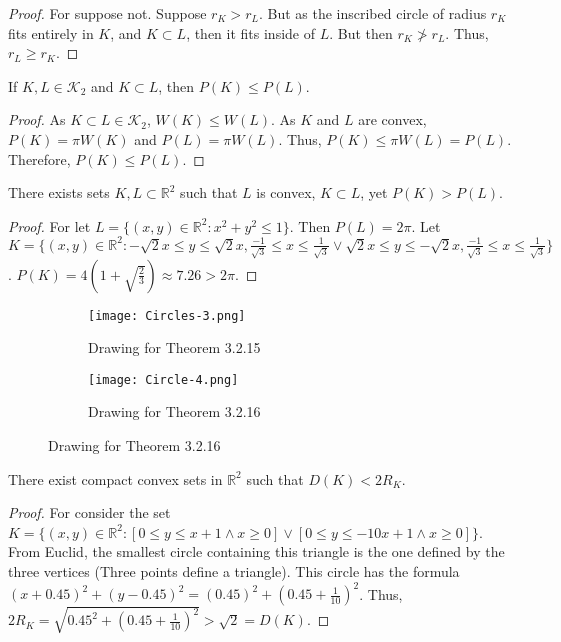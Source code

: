 \documentclass[crop=false,class=article,oneside]{standalone}
\begin{document}
        \begin{proof}
        For suppose not. Suppose $r_K> r_L$. But as the inscribed circle of radius $r_K$ fits entirely in $K$, and $K\subset L$, then it fits inside of $L$. But then $r_K \not > r_L$. Thus, $r_L \geq r_K$.
        \end{proof}
        \begin{theorem}
        If $K,L\in \mathscr{K}_2$ and $K\subset L$, then $P(K)\leq P(L)$.
        \end{theorem}
        \begin{proof}
        As $K\subset L\in  \mathscr{K}_2$, $W(K)\leq W(L)$. As $K$ and $L$ are convex, $P(K)=\pi W(K)$ and $P(L)=\pi W(L)$. Thus, $P(K) \leq \pi W(L) = P(L)$. Therefore, $P(K)\leq P(L)$.
        \end{proof}
        \begin{theorem}
        There exists sets $K,L\subset \mathbb{R}^2$ such that $L$ is convex, $K\subset L$, yet $P(K)>P(L)$.
        \end{theorem}
        \begin{proof}
        For let $L = \{(x,y)\in \mathbb{R}^2: x^2 + y^2 \leq 1\}$. Then $P(L) = 2\pi$. Let $K = \{(x,y)\in \mathbb{R}^2: -\sqrt{2}x\leq y \leq \sqrt{2}x,\frac{-1}{\sqrt{3}} \leq x \leq \frac{1}{\sqrt{3}} \lor \sqrt{2}x\leq y \leq -\sqrt{2}x,\frac{-1}{\sqrt{3}} \leq x \leq \frac{1}{\sqrt{3}} \}$. $P(K) = 4(1+ \sqrt{\frac{2}{3}}) \approx 7.26>2\pi$.
        \end{proof}
        \begin{figure}[H]
          \begin{subfigure}[b]{0.49\textwidth}
             \centering
            \texttt{[image: Circles-3.png]}
            \caption{Drawing for Theorem 3.2.15}
          \end{subfigure}
          \begin{subfigure}[b]{0.49\textwidth}
            \centering
            \texttt{[image: Circle-4.png]}
            \caption{Drawing for Theorem 3.2.16}
          \end{subfigure}
        \end{figure}
        \begin{theorem}
        There exist compact convex sets in $\mathbb{R}^2$ such that $D(K) < 2R_K$.
        \end{theorem}
        \begin{proof}
        For consider the set $K=\{(x,y)\in \mathbb{R}^2: [0\leq y\leq x+1 \land x\geq 0]\lor [0\leq y\leq -10x+1\land x\geq 0]\}$. From Euclid, the smallest circle containing this triangle is the one defined by the three vertices (Three points define a triangle). This circle has the formula $(x+0.45)^2+(y-0.45)^2 = (0.45)^2 +(0.45+\frac{1}{10})^2$. Thus, $2R_K = \sqrt{0.45^2 +(0.45+\frac{1}{10})^2} > \sqrt{2} = D(K)$.
        \end{proof}
\end{document}
